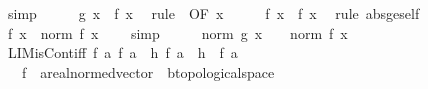 \begin{isabellebody}
\ simp\isanewline
\ \ \isamarkupfalse%
\ \isamarkupfalse%
\ {\isachardoublequoteopen}g\ x\ {\isasymle}\ f\ x{\isachardoublequoteclose}\ \isamarkupfalse%
\ {\isacharparenleft}{\kern0pt}rule\ {}\ {\isacharbrackleft}{\kern0pt}OF\ x{\isacharbrackright}{\kern0pt}{\isacharparenright}{\kern0pt}\isanewline
\ \ \isamarkupfalse%
\ \isamarkupfalse%
\ {\isachardoublequoteopen}f\ x\ {\isasymle}\ {\isasymbar}f\ x{\isasymbar}{\isachardoublequoteclose}\ \isamarkupfalse%
\ {\isacharparenleft}{\kern0pt}rule\ abs{\isacharunderscore}{\kern0pt}ge{\isacharunderscore}{\kern0pt}self{\isacharparenright}{\kern0pt}\isanewline
\ \ \isamarkupfalse%
\ \isamarkupfalse%
\ {\isachardoublequoteopen}{\isasymbar}f\ x{\isasymbar}\ {\isacharequal}{\kern0pt}\ norm\ {\isacharparenleft}{\kern0pt}f\ x\ {\isacharminus}{\kern0pt}\ {}{\isacharparenright}{\kern0pt}{\isachardoublequoteclose}\ \isamarkupfalse%
\ simp\isanewline
\ \ \isamarkupfalse%
\ \isamarkupfalse%
\ {\isachardoublequoteopen}norm\ {\isacharparenleft}{\kern0pt}g\ x\ {\isacharminus}{\kern0pt}\ {}{\isacharparenright}{\kern0pt}\ {\isasymle}\ norm\ {\isacharparenleft}{\kern0pt}f\ x\ {\isacharminus}{\kern0pt}\ {}{\isacharparenright}{\kern0pt}{\isachardoublequoteclose}\ \isacommand{{\isachardot}{\kern0pt}}\isamarkupfalse%
\isanewline
{}\isamarkupfalse%
%
\endisatagproof
{\isafoldproof}%
%
\isadelimproof
%
\endisadelimproof
%
\isadelimdocument
%
\endisadelimdocument
%
\isatagdocument
%
\isamarkuptrue%
%
\endisatagdocument
{\isafolddocument}%
%
\isadelimdocument
%
\endisadelimdocument
{}\isamarkupfalse%
\ LIM{\isacharunderscore}{\kern0pt}isCont{\isacharunderscore}{\kern0pt}iff{\isacharcolon}{\kern0pt}\ {\isachardoublequoteopen}{\isacharparenleft}{\kern0pt}f\ {\isasymmidarrow}a{\isasymrightarrow}\ f\ a{\isacharparenright}{\kern0pt}\ {\isacharequal}{\kern0pt}\ {\isacharparenleft}{\kern0pt}{\isacharparenleft}{\kern0pt}{\isasymlambda}h{\isachardot}{\kern0pt}\ f\ {\isacharparenleft}{\kern0pt}a\ {\isacharplus}{\kern0pt}\ h{\isacharparenright}{\kern0pt}{\isacharparenright}{\kern0pt}\ {\isasymmidarrow}{}{\isasymrightarrow}\ f\ a{\isacharparenright}{\kern0pt}{\isachardoublequoteclose}\isanewline
\ \ \ f\ {\isacharcolon}{\kern0pt}{\isacharcolon}{\kern0pt}\ {\isachardoublequoteopen}{\isacharprime}{\kern0pt}a{\isacharcolon}{\kern0pt}{\isacharcolon}{\kern0pt}real{\isacharunderscore}{\kern0pt}normed{\isacharunderscore}{\kern0pt}vector\ {\isasymRightarrow}\ {\isacharprime}{\kern0pt}b{\isacharcolon}{\kern0pt}{\isacharcolon}{\kern0pt}topological{\isacharunderscore}{\kern0pt}space{\isachardoublequoteclose}\isanewline

\end{isabellebody}
